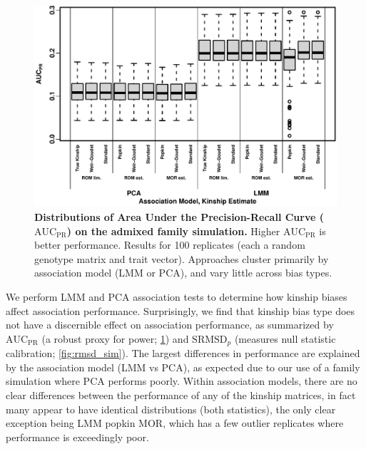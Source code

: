 \documentclass[11pt]{article}
\newcommand{\rmsd}{\text{SRMSD}_p}
\newcommand{\auc}{\text{AUC}_\text{PR}}
\begin{document}
\begin{figure}[bp!]
  \centering
  \includegraphics[width=\textwidth]{sim-admix-n1000-m100000-k3-f0.3-s0.5-mc100-h0.8-g20-fes/auc.pdf}
  \caption{
    {\bf Distributions of Area Under the Precision-Recall Curve ($\auc$) on the admixed family simulation.}
    Higher $\auc$ is better performance.
    Results for 100 replicates (each a random genotype matrix and trait vector).
    Approaches cluster primarily by association model (LMM or PCA), and vary little across bias types.
  }
  \label{fig:auc_sim}
\end{figure}

We perform LMM and PCA association tests to determine how kinship biases affect association performance.
Surprisingly, we find that kinship bias type does not have a discernible effect on association performance, as summarized by $\auc$ (a robust proxy for power; \cref{fig:auc_sim}) and $\rmsd$ (measures null statistic calibration; \cref{fig:rmsd_sim}).
The largest differences in performance are explained by the association model (LMM vs PCA), as expected due to our use of a family simulation where PCA performs poorly.
Within association models, there are no clear differences between the performance of any of the kinship matrices, in fact many appear to have identical distributions (both statistics), the only clear exception being LMM popkin MOR, which has a few outlier replicates where performance is exceedingly poor.
\end{document}
